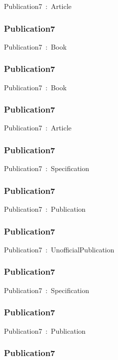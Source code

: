 \documentclass{article}
\begin{document}
Publication7~:~Article

\subsubsection*{Publication7}

Publication7~:~Book

\subsubsection*{Publication7}

Publication7~:~Book

\subsubsection*{Publication7}

Publication7~:~Article

\subsubsection*{Publication7}

Publication7~:~Specification

\subsubsection*{Publication7}

Publication7~:~Publication

\subsubsection*{Publication7}

Publication7~:~UnofficialPublication

\subsubsection*{Publication7}

Publication7~:~Specification

\subsubsection*{Publication7}

Publication7~:~Publication

\subsubsection*{Publication7}
\end{document}
